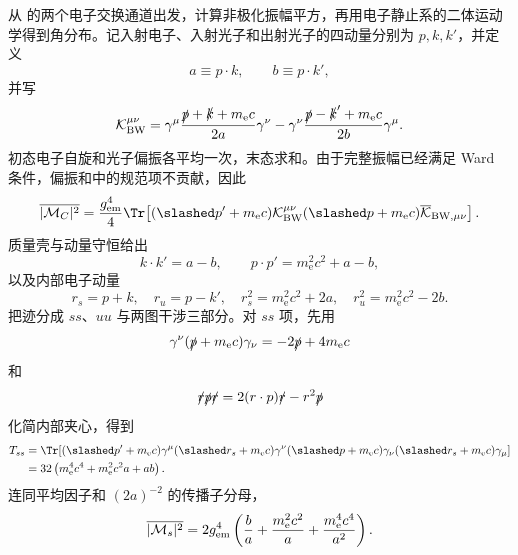 \begin{derivation}
从 的两个电子交换通道出发，计算非极化振幅平方，再用电子静止系的二体运动学得到角分布。记入射电子、入射光子和出射光子的四动量分别为 $p,k,k'$，并定义
\begin{equation*}
 a\equiv p\cdot k,\qquad b\equiv p\cdot k',
\end{equation*}
并写
\begin{equation*}
 \mathcal K_{\rm BW}^{\mu\nu}
 =\gamma^\mu\frac{\slashed p+\slashed k+m_{\mathrm e} c}{2a}\gamma^\nu
 -\gamma^\nu\frac{\slashed p-\slashed k'+m_{\mathrm e} c}{2b}\gamma^\mu .
\end{equation*}
初态电子自旋和光子偏振各平均一次，末态求和。由于完整振幅已经满足 Ward 条件，偏振和中的规范项不贡献，因此
\begin{equation*}
 \overline{|\mathcal M_C|^2}
 =\frac{g_{\rm em}^4}{4}
 \Tr\!\left[(\slashed p'+m_{\mathrm e} c)\mathcal K_{\rm BW}^{\mu\nu}
 (\slashed p+m_{\mathrm e} c)\overline{\mathcal K}_{{\rm BW},\mu\nu}\right].
\end{equation*}
质量壳与动量守恒给出
\begin{equation*}
 k\cdot k'=a-b,\qquad
 p\cdot p'=m_{\mathrm e}^2c^2+a-b,
\end{equation*}
以及内部电子动量
\begin{equation*}
 r_s=p+k,\quad r_u=p-k',\quad
 r_s^2=m_{\mathrm e}^2c^2+2a,\quad r_u^2=m_{\mathrm e}^2c^2-2b.
\end{equation*}
把迹分成 $ss$、$uu$ 与两图干涉三部分。对 $ss$ 项，先用
\begin{equation*}
 \gamma^\nu(\slashed p+m_{\mathrm e} c)\gamma_\nu=-2\slashed p+4m_{\mathrm e} c
\end{equation*}
和
\begin{equation*}
 \slashed r\slashed p\slashed r=2(r\cdot p)\slashed r-r^2\slashed p
\end{equation*}
化简内部夹心，得到
\begin{align*}
 T_{ss}
 &=\Tr\!\left[(\slashed p'+m_{\mathrm e} c)\gamma^\mu(\slashed r_s+m_{\mathrm e} c)
 \gamma^\nu(\slashed p+m_{\mathrm e} c)\gamma_\nu(\slashed r_s+m_{\mathrm e} c)\gamma_\mu\right]\\
 &=32\left(m_{\mathrm e}^4c^4+m_{\mathrm e}^2c^2a+ab\right).
\end{align*}
连同平均因子和 $(2a)^{-2}$ 的传播子分母，
\begin{equation*}
 \overline{|\mathcal M_s|^2}
 =2g_{\rm em}^4\left(\frac ba+\frac{m_{\mathrm e}^2c^2}{a}+\frac{m_{\mathrm e}^4c^4}{a^2}\right).

\end{equation*}
\end{derivation}
